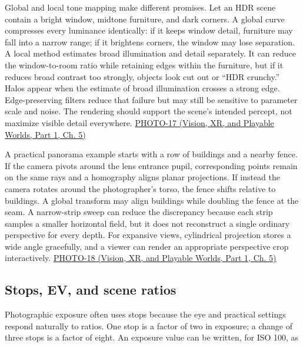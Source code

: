 Global and local tone mapping make different promises. Let an HDR scene contain a bright window, midtone furniture, and dark corners. A global curve compresses every luminance identically: if it keeps window detail, furniture may fall into a narrow range; if it brightens corners, the window may lose separation. A local method estimates broad illumination and detail separately. It can reduce the window-to-room ratio while retaining edges within the furniture, but if it reduces broad contrast too strongly, objects look cut out or ``HDR crunchy.'' Halos appear when the estimate of broad illumination crosses a strong edge. Edge-preserving filters reduce that failure but may still be sensitive to parameter scale and noise. The rendering should support the scene's intended percept, not maximize visible detail everywhere. \href{../07-Vision-XR-and-Playable-Worlds-P01/main.pdf\#nameddest=04-visual-computing-ii-ch036-photo-17---photography-session-17}{PHOTO-17 (Vision, XR, and Playable Worlds, Part 1, Ch. 5)}

A practical panorama example starts with a row of buildings and a nearby fence. If the camera pivots around the lens entrance pupil, corresponding points remain on the same rays and a homography aligns planar projections. If instead the camera rotates around the photographer's torso, the fence shifts relative to buildings. A global transform may align buildings while doubling the fence at the seam. A narrow-strip sweep can reduce the discrepancy because each strip samples a smaller horizontal field, but it does not reconstruct a single ordinary perspective for every depth. For expansive views, cylindrical projection stores a wide angle gracefully, and a viewer can render an appropriate perspective crop interactively. \href{../07-Vision-XR-and-Playable-Worlds-P01/main.pdf\#nameddest=04-visual-computing-ii-ch036-photo-18---photography-session-18}{PHOTO-18 (Vision, XR, and Playable Worlds, Part 1, Ch. 5)}

\subsection{Stops, EV, and scene ratios}\label{03-visual-computing-i-ch003-stops-ev-and-scene-ratios}

\hypertarget{03-visual-computing-i-ch003-stops-ev-and-scene-ratios}{}

Photographic exposure often uses stops because the eye and practical settings respond naturally to ratios. One stop is a factor of two in exposure; a change of three stops is a factor of eight. An exposure value can be written, for ISO 100, as

